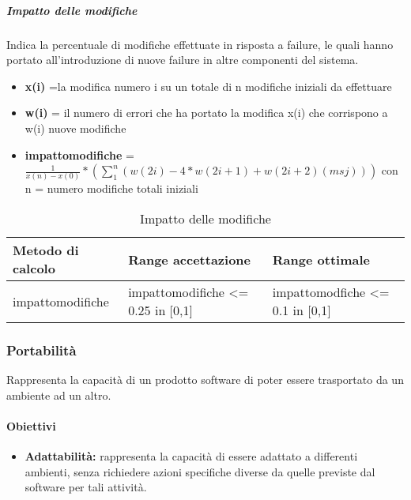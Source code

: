 			
			\subparagraph{Impatto delle modifiche}
			Indica la percentuale di modifiche effettuate in risposta a failure, le quali hanno portato all’introduzione di nuove failure in altre componenti del sistema.
			
			\begin{itemize}
				\item \textbf{x(i)} =la modifica numero i su un totale di n modifiche iniziali da effettuare
				\item \textbf{w(i)} = il numero di errori che ha portato la modifica x(i) che corrispono a w(i) nuove modifiche
				\item \textbf{impattomodifiche} = \begin{math}
				\frac{1}{x(n)-x(0)}*(\sum_{1}^{n}(w(2i) - 4*w(2i+1) + w(2i+2)(msj))) 
				\end{math} con n = numero modifiche totali iniziali
			\end{itemize}
			
			\begin{table}[H]
				\begin{longtable}{>{\centering\arraybackslash}p{5cm}|>{\centering\arraybackslash}p{5cm} | >{\centering\arraybackslash}p{5cm}}
					\hline
					\rowcolor{Gray}
					\textbf{Metodo di calcolo} & \textbf{Range accettazione} & \textbf{Range ottimale} \\
					\hline
					impattomodifiche &impattomodifiche <= 0.25 in [0,1] & impattomodfiche <= 0.1 in [0,1]
				\end{longtable}
				\caption{Impatto delle modifiche}
			\end{table}
			
		
	
	\subsubsection{Portabilità}
	Rappresenta la capacità di un prodotto software di poter essere trasportato da un ambiente ad un altro.
		
		\paragraph{Obiettivi}
			\begin{itemize}
				\item \textbf{Adattabilità:} rappresenta la capacità di essere adattato a differenti ambienti, senza richiedere azioni specifiche diverse da quelle previste dal software per tali attività.
			\end{itemize}
		
